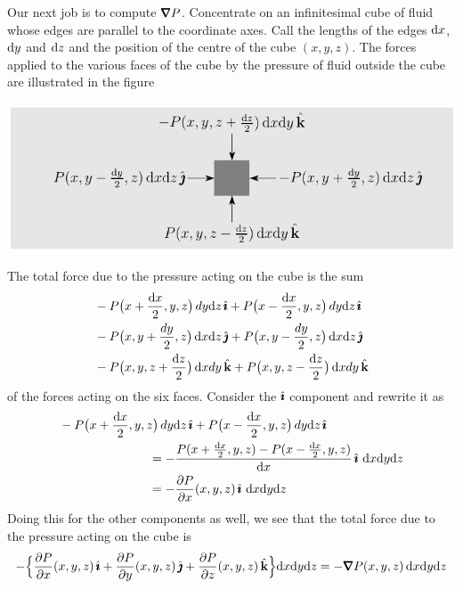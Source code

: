 Our next job is to compute $\vnabla P$. Concentrate on an infinitesimal
cube of fluid whose edges are parallel to the coordinate axes. Call the 
lengths of the edges $\mathrm{d}x$, $\mathrm{d}y$ and $\mathrm{d}z$ and the position 
of the centre of the cube $(x,y,z)$. The forces applied to the various 
faces of the cube by the pressure of fluid outside the cube are 
illustrated in the figure
\begin{efig}
\begin{center}
    \includegraphics{fluidcube.pdf}
\end{center}
\end{efig}
The total force due to the pressure acting on the cube
is the sum 
\begin{align*}
&-P\big(x+\frac{\mathrm{d}x}{2},y,z\big)\,dy\mathrm{d}z\,\hat{\pmb{\imath}}
+P\big(x-\frac{\mathrm{d}x}{2},y,z\big)\,dy\mathrm{d}z\,\hat{\pmb{\imath}}\\
&-P\big(x,y+\frac{dy}{2},z\big)\,\mathrm{d}x\mathrm{d}z\,\hat{\pmb{\jmath}}
+P\big(x,y-\frac{dy}{2},z\big)\,\mathrm{d}x\mathrm{d}z\,\hat{\pmb{\jmath}}\\
&-P\big(x,y,z+\frac{\mathrm{d}z}{2}\big)\,\mathrm{d}xdy\,\hat{\mathbf{k}}
+P\big(x,y,z-\frac{\mathrm{d}z}{2}\big)\,\mathrm{d}xdy\,\hat{\mathbf{k}}
\end{align*}
of the forces acting on the six faces.
Consider the $\hat{\pmb{\imath}}$ component and rewrite it as
\begin{align*}
&-P\big(x+\frac{\dee{x}}{2},y,z\big)\,dy\dee{z}\,\hi
+P\big(x-\frac{\dee{x}}{2},y,z\big)\,dy\dee{z}\,\hi \\
&\hskip1in
=-\frac{P(x+{\dee{x}\over2},y,z)-P(x-{\dee{x}\over2},y,z)}{\dee{x}}\,\hi\ 
     \dee{x} \dee{y} \dee{z} \\
&\hskip1in
= - \frac{\partial P}{\partial x}(x,y,z)\,\hi\ 
     \dee{x} \dee{y} \dee{z}
\end{align*}
Doing this for the other components as well,
we see that the total force due to the pressure acting on the cube is
\begin{align*}
-\Big\{\frac{\partial P}{\partial x}(x,y,z)\,\hi
+\frac{\partial P}{\partial y}(x,y,z)\,\hj
+\frac{\partial P}{\partial z}(x,y,z)\,\hk
\Big\}\dee{x} \dee{y} \dee{z}
=-\vnabla P(x,y,z)\, \dee{x} \dee{y} \dee{z}
\end{align*}
